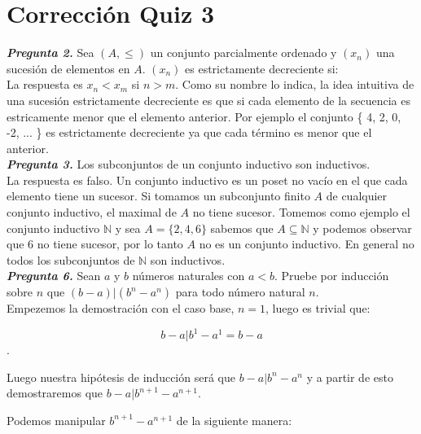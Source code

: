 \documentclass{report}
\begin{document}
    \tableofcontents

    \pagebreak
    \chapter{ Corrección Quiz 3 }

    \noindent \textit{\textbf{Pregunta 2.}} Sea $(A, \leq)$ un conjunto parcialmente ordenado y $(x_n)$ una sucesión de elementos en $A$. $(x_n)$ es estrictamente decreciente si:\\

    \noindent La respuesta es $x_n < x_m$ si $n > m$. Como su nombre lo indica, la idea intuitiva de una sucesión estrictamente decreciente es que si cada elemento de la secuencia es estricamente menor que el elemento anterior. Por ejemplo el conjunto \{ 4, 2, 0, -2, ... \} es estrictamente decreciente ya que cada término es menor que el anterior.\\

    \noindent \textit{\textbf{Pregunta 3.}} Los subconjuntos de un conjunto inductivo son inductivos.\\

    \noindent La respuesta es falso. Un conjunto inductivo es un poset no vacío en el que cada elemento tiene un sucesor. Si tomamos un subconjunto finito $A$ de cualquier conjunto inductivo, el maximal de $A$ no tiene sucesor. Tomemos como ejemplo el conjunto inductivo $\mathbb{N}$ y sea $A = \{2, 4, 6\}$ sabemos que $A \subseteq \mathbb{N}$ y podemos observar que 6 no tiene sucesor, por lo tanto $A$ no es un conjunto inductivo. En general no todos los subconjuntos de $\mathbb{N}$ son inductivos.\\

    \noindent \textit{\textbf{Pregunta 6.}} Sean $a$ y $b$ números naturales con $a<b$. Pruebe por inducción sobre $n$ que $(b-a)|(b^n-a^n)$ para todo número natural $n$.\\

    \noindent Empezemos la demostración con el caso base, $n = 1$, luego es trivial que:

    \[
        b-a | b^1 - a^1 = b -a
    \].

    \noindent Luego nuestra hipótesis de inducción será que $b - a| b^n - a^n$ y a partir de esto demostraremos que $b - a| b^{n+1} - a^{n+1}$.

    \noindent Podemos manipular $b^{n+1} - a^{n+1}$ de la siguiente manera:
\end{document}
